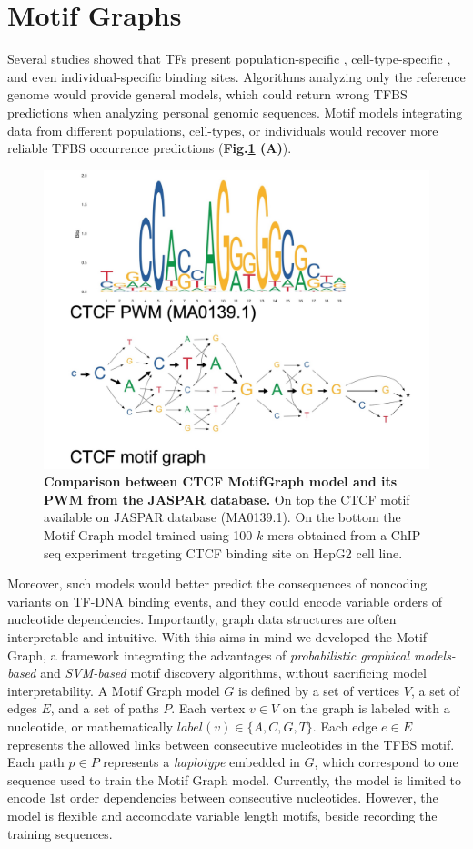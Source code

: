 \documentclass[a4paper, titlepage, openright]{book}
\newcommand{\mychapter}[2]{
    \setcounter{chapter}{#1}
    \setcounter{section}{0}
    \chapter*{#2}
    \addcontentsline{toc}{chapter}{#2}
}
\begin{document}
\mychapter{3}{Motif Graphs}
Several studies showed that TFs present population-specific \citep{kasowski2010variation}, cell-type-specific \citep{gertz2013distinct,arvey2012sequence}, and even individual-specific \citep{tognon2021grafimo} binding sites. Algorithms analyzing only the reference genome would provide general models, which could return wrong TFBS predictions when analyzing personal genomic sequences. Motif models integrating data from different populations, cell-types, or individuals would recover more reliable TFBS occurrence predictions (\textbf{Fig.\ref{fig:ctcf_mg} (A)}).
\begin{figure}
	\centering
	\includegraphics[width=\textwidth]{figures/ctcf_mg.jpg}
	\caption[Comparison between CTCF Motif Graph model and its PWM from the JASPAR database.]{\textbf{Comparison between CTCF MotifGraph model and its PWM from the JASPAR database.} On top the CTCF motif available on JASPAR database (MA0139.1). On the bottom the Motif Graph model trained using 100 $k$-mers obtained from a ChIP-seq experiment trageting CTCF binding site on HepG2 cell line.}
	\label{fig:ctcf_mg}
\end{figure} 
Moreover, such models would better predict the consequences of noncoding variants on TF-DNA binding events, and they could encode variable orders of nucleotide dependencies. Importantly, graph data structures are often interpretable and intuitive. With this aims in mind we developed the Motif Graph, a framework integrating the advantages of \emph{probabilistic graphical models-based} and \emph{SVM-based} motif discovery algorithms, without sacrificing model interpretability. A Motif Graph model $G$ is defined by a set of vertices $V$, a set of edges $E$, and a set of paths $P$. Each vertex $v \in V$ on the graph is labeled with a nucleotide, or mathematically $label(v) \in \{A, C, G, T\}$. Each edge $e \in E$ represents the allowed links between consecutive nucleotides in the TFBS motif. Each path $p \in P$ represents a \emph{haplotype} embedded in $G$, which correspond to one sequence used to train the Motif Graph model. Currently, the model is limited to encode $1$st order dependencies between consecutive nucleotides. However, the model is flexible and accomodate variable length motifs, beside recording the training sequences.
\end{document}
